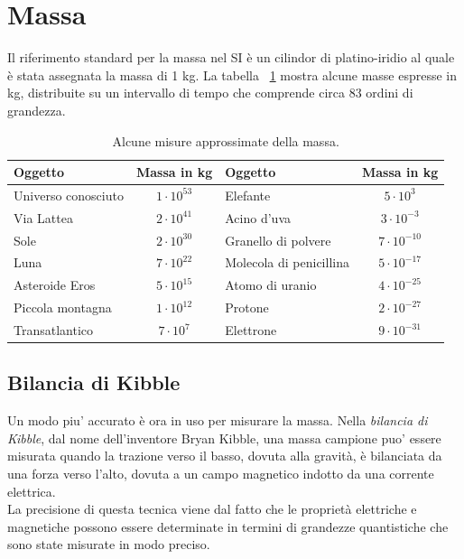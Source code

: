 \documentclass[12pt]{report}
\begin{document}
	\section{Massa}
	Il riferimento standard per la massa nel SI è  un cilindor di platino-iridio al quale è  stata assegnata la massa di 1 kg. La tabella ~\ref{tab:masse} mostra alcune masse espresse in kg, distribuite su un intervallo di tempo che comprende circa 83 ordini di grandezza.
	\begin{table}[H]
		\centering
		\caption{Alcune misure approssimate della massa.}
		\label{tab:masse}
		\begin{tabular}{@{}p{4cm} c p{4cm} c@{}}
			\hline
			\textbf{Oggetto} & \textbf{Massa in kg} & \textbf{Oggetto} & \textbf{Massa in kg} \\
			\hline
			Universo conosciuto & $1 \cdot 10^{53}$ & Elefante & $5 \cdot 10^{3}$ \\
			Via Lattea & $2 \cdot 10^{41}$ & Acino d'uva & $3 \cdot 10^{-3}$ \\
			Sole & $2 \cdot 10^{30}$ & Granello di polvere & $7 \cdot 10^{-10}$ \\
			Luna & $7 \cdot 10^{22}$ & Molecola di penicillina & $5 \cdot 10^{-17}$ \\
			Asteroide Eros & $5 \cdot 10^{15}$ & Atomo di uranio & $4 \cdot 10^{-25}$ \\
			Piccola montagna & $1 \cdot 10^{12}$ & Protone & $2 \cdot 10^{-27}$ \\
			Transatlantico & $7 \cdot 10^{7}$ & Elettrone & $9 \cdot 10^{-31}$ \\
			\hline
		\end{tabular}
	\end{table}
	\subsection{Bilancia di Kibble}
	Un modo piu' accurato è  ora in uso per misurare la massa. Nella \textit{bilancia di Kibble}, dal nome dell'inventore Bryan Kibble, una massa campione puo' essere misurata quando la trazione verso il basso, dovuta alla gravità, è  bilanciata da una forza verso l'alto, dovuta a un campo magnetico indotto da una corrente elettrica. \\
	La precisione di questa tecnica viene dal fatto che le proprietà elettriche e magnetiche possono essere determinate in termini di grandezze quantistiche che sono state misurate in modo preciso.
\end{document}
